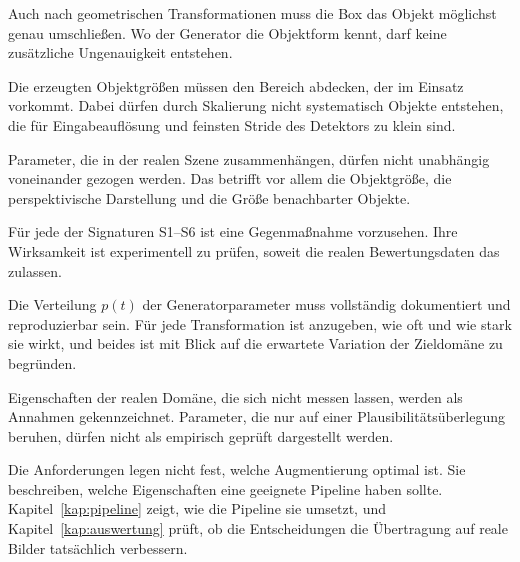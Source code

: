 \begin{description}[leftmargin=0pt,labelsep=0.5em,itemsep=3pt,
                    font=\normalfont\bfseries]
  \item[A1 -- Labelgenauigkeit.] Auch nach geometrischen Transformationen muss
  die Box das Objekt möglichst genau umschließen. Wo der Generator die
  Objektform kennt, darf keine zusätzliche Ungenauigkeit entstehen.

  \item[A2 -- Kalibrierte Objektgrößen.] Die erzeugten Objektgrößen müssen den
  Bereich abdecken, der im Einsatz vorkommt. Dabei dürfen durch Skalierung
  nicht systematisch Objekte entstehen, die für Eingabeauflösung und feinsten
  Stride des Detektors zu klein sind.

  \item[A3 -- Physikalisch plausible Größenabhängigkeiten.] Parameter, die in
  der realen Szene zusammenhängen, dürfen nicht unabhängig voneinander gezogen
  werden. Das betrifft vor allem die Objektgröße, die perspektivische
  Darstellung und die Größe benachbarter Objekte.

  \item[A4 -- Kontrolle synthetischer Signaturen.] Für jede der Signaturen
  S1--S6 ist eine Gegenmaßnahme vorzusehen. Ihre Wirksamkeit ist experimentell
  zu prüfen, soweit die realen Bewertungsdaten das zulassen.

  \item[A5 -- Kontrollierbare Variation.] Die Verteilung $p(t)$ der
  Generatorparameter muss vollständig dokumentiert und reproduzierbar sein. Für
  jede Transformation ist anzugeben, wie oft und wie stark sie wirkt, und
  beides ist mit Blick auf die erwartete Variation der Zieldomäne zu begründen.

  \item[A6 -- Trennung von Annahme und Messung.] Eigenschaften der realen
  Domäne, die sich nicht messen lassen, werden als Annahmen gekennzeichnet.
  Parameter, die nur auf einer Plausibilitätsüberlegung beruhen, dürfen nicht
  als empirisch geprüft dargestellt werden.
\end{description}

Die Anforderungen legen nicht fest, welche Augmentierung optimal ist. Sie
beschreiben, welche Eigenschaften eine geeignete Pipeline haben sollte.
Kapitel~\ref{kap:pipeline} zeigt, wie die Pipeline sie umsetzt, und
Kapitel~\ref{kap:auswertung} prüft, ob die Entscheidungen die Übertragung auf
reale Bilder tatsächlich verbessern.


%

%
